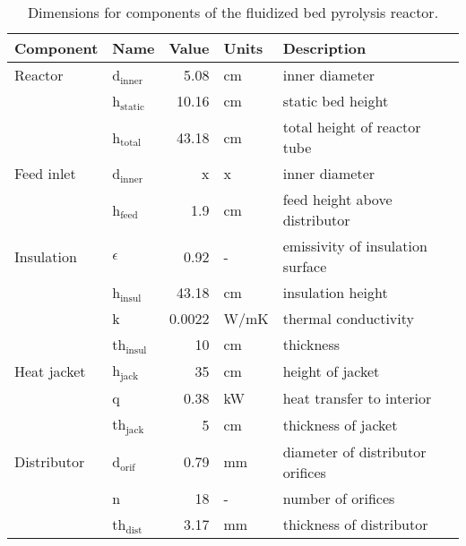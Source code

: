 \begin{table}[H]
    \centering
    \caption{Dimensions for components of the fluidized bed pyrolysis reactor.}
    \label{tab:dimensions}
    \begin{tabular}{llrll}
        \toprule
        Component & Name & Value & Units & Description \\
        \midrule
        Reactor
            & d$_\textrm{inner}$ & 5.08 & cm & inner diameter \\
            & h$_\textrm{static}$ & 10.16 & cm & static bed height \\
            & h$_\textrm{total}$ & 43.18 & cm & total height of reactor tube \\
        Feed inlet
            & d$_\textrm{inner}$ & x & x & inner diameter \\
            & h$_\textrm{feed}$ & 1.9 & cm & feed height above distributor \\
        Insulation
            & $\epsilon$ & 0.92 & - & emissivity of insulation surface \\
            & h$_\textrm{insul}$ & 43.18 & cm & insulation height \\
            & k & 0.0022 & W/mK & thermal conductivity \\
            & th$_\textrm{insul}$ & 10 & cm & thickness \\
        Heat jacket
            & h$_\textrm{jack}$ & 35 & cm & height of jacket \\
            & q & 0.38 & kW & heat transfer to interior \\
            & th$_\textrm{jack}$ & 5 & cm & thickness of jacket \\
        Distributor
            & d$_\textrm{orif}$ & 0.79 & mm & diameter of distributor orifices \\
            & n & 18 & - &number of orifices \\
            & th$_\textrm{dist}$ & 3.17 & mm & thickness of distributor \\
        \bottomrule
    \end{tabular}
\end{table}

